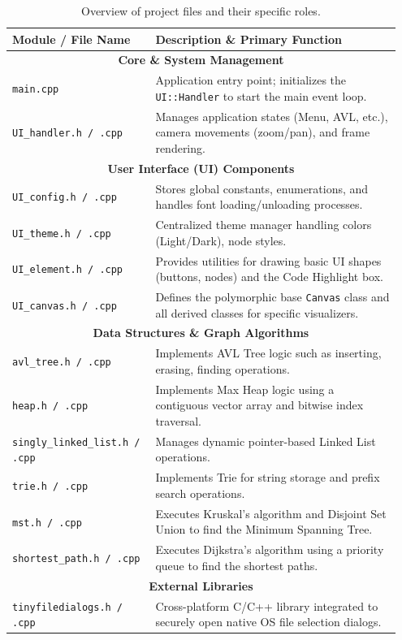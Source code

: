 \begin{table}[h!]
    \centering
    \begin{tabular}{|p{0.35\linewidth}|p{0.6\linewidth}|}
        \hline
        \textbf{Module / File Name} & \textbf{Description \& Primary Function} \\
        \hline
        \multicolumn{2}{|c|}{\textbf{Core \& System Management}} \\
        \hline
        \texttt{main.cpp} & Application entry point; initializes the \texttt{UI::Handler} to start the main event loop. \\
        \hline
        \texttt{UI\_handler.h / .cpp} & Manages application states (Menu, AVL, etc.), camera movements (zoom/pan), and frame rendering. \\
        \hline
        \multicolumn{2}{|c|}{\textbf{User Interface (UI) Components}} \\
        \hline
        \texttt{UI\_config.h / .cpp} & Stores global constants, enumerations, and handles font loading/unloading processes. \\
        \hline
        \texttt{UI\_theme.h / .cpp} & Centralized theme manager handling colors (Light/Dark), node styles. \\
        \hline
        \texttt{UI\_element.h / .cpp} & Provides utilities for drawing basic UI shapes (buttons, nodes) and the Code Highlight box. \\
        \hline
        \texttt{UI\_canvas.h / .cpp} & Defines the polymorphic base \texttt{Canvas} class and all derived classes for specific visualizers. \\
        \hline
        \multicolumn{2}{|c|}{\textbf{Data Structures \& Graph Algorithms}} \\
        \hline
        \texttt{avl\_tree.h / .cpp} & Implements AVL Tree logic such as inserting, erasing, finding operations. \\
        \hline
        \texttt{heap.h / .cpp} & Implements Max Heap logic using a contiguous vector array and bitwise index traversal. \\
        \hline
        \texttt{singly\_linked\_list.h / .cpp} & Manages dynamic pointer-based Linked List operations. \\
        \hline
        \texttt{trie.h / .cpp} & Implements Trie for string storage and prefix search operations. \\
        \hline
        \texttt{mst.h / .cpp} & Executes Kruskal's algorithm and Disjoint Set Union to find the Minimum Spanning Tree. \\
        \hline
        \texttt{shortest\_path.h / .cpp} & Executes Dijkstra's algorithm using a priority queue to find the shortest paths. \\
        \hline
        \multicolumn{2}{|c|}{\textbf{External Libraries}} \\
        \hline
        \texttt{tinyfiledialogs.h / .cpp} & Cross-platform C/C++ library integrated to securely open native OS file selection dialogs. \\
        \hline
    \end{tabular}
    \caption{Overview of project files and their specific roles.}
    \label{tab:file_description}
\end{table}


